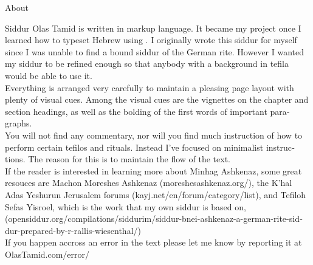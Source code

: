 \documentclass[twoside, openany, parskip=half, 11pt]{book}
\begin{document}
\begin{minipage}{\textwidth}

\begin{english}
\begin{center} %
\begin{LARGE}
About
\end{LARGE}
\end{center}

Siddur Olas Tamid is written in \XeLaTeX  markup language. It became my project once I learned how to typeset Hebrew using \XeLaTeX. I originally wrote this siddur for myself since I was unable to find a bound siddur of the German rite. However I wanted my siddur to be refined enough so that anybody with a background in tefila would be able to use it. \\


Everything is arranged very carefully to maintain a pleasing page layout with plenty of visual cues. Among the visual cues are the vignettes on the chapter and section headings, as well as the bolding of the first words of important paragraphs. \\


You will not find any commentary, nor will you find much instruction of how to perform certain tefilos and rituals. Instead I've focused on minimalist instructions. The reason for this is to maintain the flow of the text. \\


If the reader is interested in learning more about Minhag Ashkenaz, some great resouces are Machon Moreshes Ashkenaz (moreshesashkenaz.org/), the K'hal Adas Yeshurun Jerusalem forums (kayj.net/en/forum/category/list), and Tefiloh Sefas Yisroel, which is the work that my own siddur is based on, (opensiddur.org/compilations/siddurim/siddur-bnei-ashkenaz-a-german-rite-siddur-prepared-by-r-rallis-wiesenthal/) \\

If you happen accross an error in the text please let me know by reporting it at OlasTamid.com/error/


\end{english}

\end{minipage}

\clearpage
\end{document}

